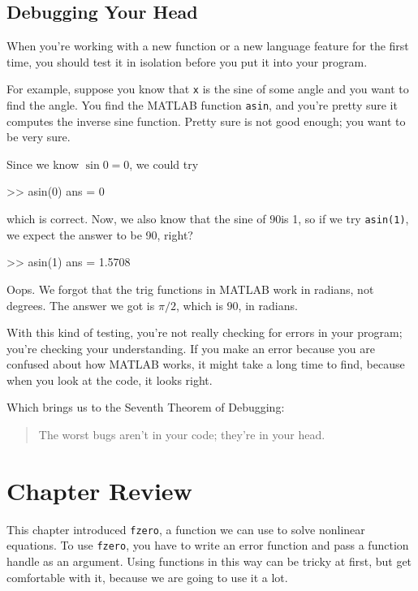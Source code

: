 \subsection{Debugging Your Head}

When you're working with a new function or a new language feature
for the first time, you should test it in isolation before you
put it into your program.


For example, suppose you know that \lstinline{x} is the sine of some
angle and you want to find the angle.  You find the MATLAB function
\lstinline{asin}, and you're pretty sure it computes the inverse sine
function.  Pretty sure is not good enough; you want to be very sure.

Since we know $\sin 0 = 0$, we could try

\begin{code}
>> asin(0)
ans = 0
\end{code}
which is correct.  Now, we also know that the sine of $90$\textdegree is
1, so if we try \lstinline{asin(1)}, we expect the answer to be 90, right?

\begin{code}
>> asin(1)
ans = 1.5708
\end{code}

Oops.  We forgot that the trig functions in MATLAB work in radians,
not degrees.  The answer we got is $\pi/2$, which is $90$\textdegree, in radians.

With this kind of testing, you're not really checking for
errors in your program; you're checking your understanding.  If you
make an error because you are confused about how MATLAB works, it
might take a long time to find, because when you look at the code,
it looks right.


Which brings us to the Seventh Theorem of Debugging:

\begin{quote}
The worst bugs aren't in your code; they're in your head.
\end{quote}

\section{Chapter Review}

This chapter introduced \lstinline{fzero}, a function we can use to solve nonlinear equations.
To use \lstinline{fzero}, you have to write an error function and pass a function handle as an argument.  Using functions in this way can be tricky at first, but get comfortable with it, because we are going to use it a lot.

